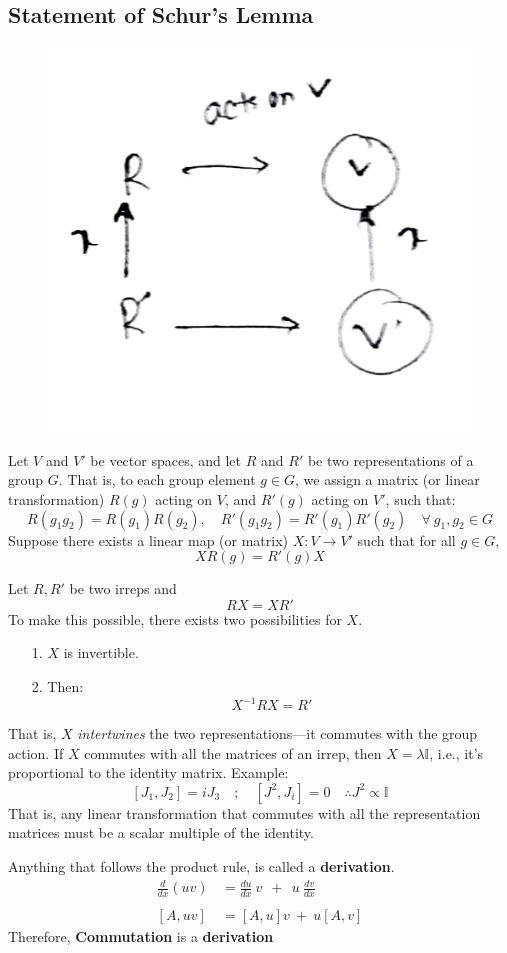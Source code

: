 \documentclass[14pt]{article} %
\begin{document}
\subsection*{Statement of Schur's Lemma}
\vspace{-0.5cm}
\begin{figure}[H]
\centering
\includegraphics[width=0.3\linewidth]{figures/L2_4.jpg}
\caption*{}
\end{figure}
\vspace{-2cm}
Let $V$ and $V'$ be vector spaces, and let $R$ and $R'$ be two representations of a group $G$. That is, to each group element $g \in G$, we assign a matrix (or linear transformation) $R(g)$ acting on $V$, and $R'(g)$ acting on $V'$, such that:
\[
R(g_1 g_2) = R(g_1) R(g_2), \quad R'(g_1 g_2) = R'(g_1) R'(g_2) \quad \forall~ g_1, g_2 \in G
\]
Suppose there exists a linear map (or matrix) $X: V \to V'$ such that for all $g \in G$,
\[
X R(g) = R'(g) X
\]
\begin{tcolorbox}[proofbox, title=Intertwiner]
Let $R, R'$ be two irreps and 
$$RX = XR'$$ 
To make this possible, there exists two possibilities for $X$.
\begin{itemize}
    \item[1.] $X$ is invertible.
    \item[2.] Then: $$X^{-1} R X = R'$$
\end{itemize}
\end{tcolorbox}
\noindent
That is, $X$ \textit{intertwines} the two representations—it commutes with the group action.
If $X$ commutes with all the matrices of an irrep, then $X = \lambda \mathbb{I}$, i.e., it's proportional to the identity matrix. Example:
\[
    [J_1, J_2] = i J_3 \quad ;\quad [J^2, J_i] = 0 \quad \therefore J^2 \propto \mathbb{I}
\]
That is, any linear transformation that commutes with all the representation matrices must be a scalar multiple of the identity.
\begin{tcolorbox}[proofbox, title=Note: Commutator is a derivative]
Anything that follows the product rule, is called a \textbf{derivation}.
\begin{align*}
    \frac{d}{dx}(uv) &= \frac{du}{dx}~v ~~+~~ u~\frac{dv}{dx} \\ \\
    [A, uv] ~&= [A, u]v ~+~ u[A, v]
\end{align*}
Therefore, \textbf{Commutation} is a \textbf{derivation}
\end{tcolorbox}
\end{document}
